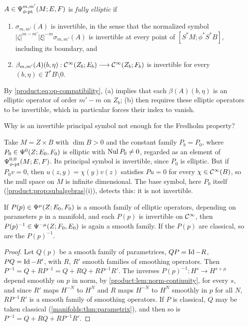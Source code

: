 \begin{definition}\label{product:def:fully-elliptic}
$A\in\Psi^{m,m'}_{\phi\text{-}\mathrm{pt}}(M;E,F)$ is \emph{fully elliptic} if
\begin{enumerate}[label=\textup{(\alph*)}]
\item $\sigma_{m,m'}(A)$ is invertible, in the sense that the normalized symbol
$|\zeta|^{m-m'}|\xi|^{-m}\sigma_{m,m'}(A)$ is invertible at every point of
$[S^*M;\phi^*S^*B]$, including its boundary, and
\item $\beta_{m,m'}(A)(b,\eta):\mathcal{C}^\infty(Z_b;E_b)\longrightarrow\mathcal{C}^\infty(Z_b;F_b)$ is invertible
for every $(b,\eta)\in T^*B\setminus0$.
\end{enumerate}
\end{definition}

By \eqref{product:eq:op-compatibility}, (a) implies that each $\beta(A)(b,\eta)$ is
an elliptic operator of order $m'-m$ on $Z_b$; (b) then requires these elliptic
operators to be invertible, which in particular forces their index to vanish.

\begin{question}
  Why is an invertible principal symbol not enough for the Fredholm property?
\end{question}
\begin{answer}
  Take $M=Z\times B$ with $\dim B>0$ and the constant family $P_b=P_0$, where
  $P_0\in\Psi^{0}(Z;E_0,F_0)$ is elliptic with $\operatorname{Nul} P_0\ne0$, regarded as an
  element of $\Psi^{0,0}_{\phi\text{-}\mathrm{pt}}(M;E,F)$. Its principal symbol is invertible, since
  $P_0$ is elliptic. But if $P_0v=0$, then $u(z,y)=\chi(y)v(z)$ satisfies $Pu=0$
  for every $\chi\in\mathcal{C}^\infty(B)$, so the null space on $M$ is infinite dimensional.
  The base symbol, here $P_0$ itself
  (\cref{product:prop:subalgebras}(i)), detects this: it is not invertible.
\end{answer}

\begin{lemma}\label{product:lem:inverse-family}
If $P(p)\in\Psi^{\mu}(Z;E_0,F_0)$ is a smooth family of elliptic operators, depending
on parameters $p$ in a manifold, and each $P(p)$ is invertible on $\mathcal{C}^\infty$, then
$P(p)^{-1}\in\Psi^{-\mu}(Z;F_0,E_0)$ is again a smooth family. If the $P(p)$ are
classical, so are the $P(p)^{-1}$.
\end{lemma}

\begin{proof}
Let $Q(p)$ be a smooth family of parametrices, $QP=\operatorname{Id}-R$, $PQ=\operatorname{Id}-R'$, with $R$,
$R'$ smooth families of smoothing operators. Then
$P^{-1}=Q+RP^{-1}=Q+RQ+RP^{-1}R'$. The inverses $P(p)^{-1}:H^s\longrightarrow
H^{s+\mu}$ depend smoothly on $p$ in norm, by \cref{product:lem:norm-continuity},
for every $s$, and since $R'$ maps $H^{-N}$ to $H^N$ and $R$ maps $H^{-N}$ to
$H^N$ smoothly in $p$ for all $N$, $RP^{-1}R'$ is a smooth family of smoothing
operators. If $P$ is classical, $Q$ may be taken classical
(\cref{manifolds:thm:parametrix}), and then so is $P^{-1}=Q+RQ+RP^{-1}R'$.
\end{proof}

